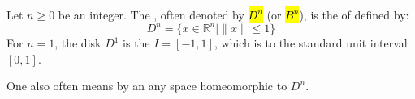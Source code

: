 \begin{definition} \label{definition:n_dimensional_unit_ball_disk}
Let $n \ge 0$ be an integer. 
The , often denoted by \hl{$D^n$} (or \hl{$B^n$}), is the  of  defined by:
$$D^n = \{x \in \mathbb{R}^n \mid \|x\| \le 1\}$$
For $n=1$, the disk $D^1$ is the  $I = [-1, 1]$, which is  to the standard unit interval $[0, 1]$.

One also often means by an  any space homeomorphic to $D^n$.
\end{definition}